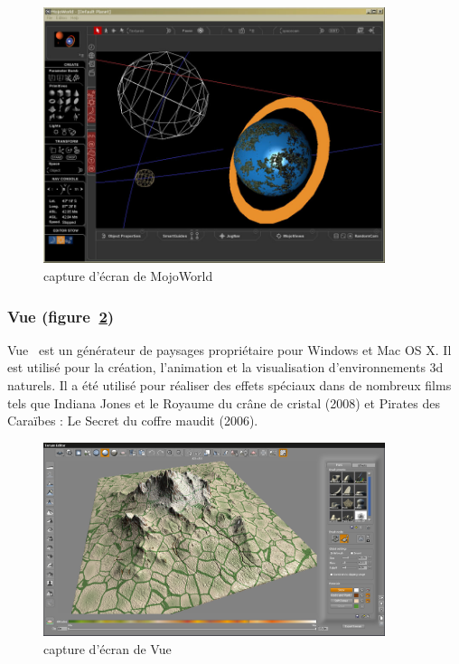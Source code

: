 \begin{figure}[!ht]
    \begin{center}
        \includegraphics[width=10cm]{resources/mojoworld.jpg}
        \caption{capture d'écran de MojoWorld}
        \label{fig:mojoworld}
    \end{center}
\end{figure}

\subsubsection{Vue (figure~\ref{fig:vue})}
Vue~\cite{Vue} est un générateur de paysages propriétaire pour Windows et Mac OS X.
Il est utilisé pour la création, l'animation et la visualisation d'environnements 3d naturels. Il a été utilisé pour réaliser des effets spéciaux dans de
nombreux films tels que Indiana Jones et le Royaume du crâne de cristal (2008) et Pirates des Caraïbes : Le Secret du coffre maudit (2006).
\begin{figure}[!ht]
    \begin{center}
        \includegraphics[width=10cm]{resources/vue.jpg}
        \caption{capture d'écran de Vue}
        \label{fig:vue}
    \end{center}
\end{figure}

